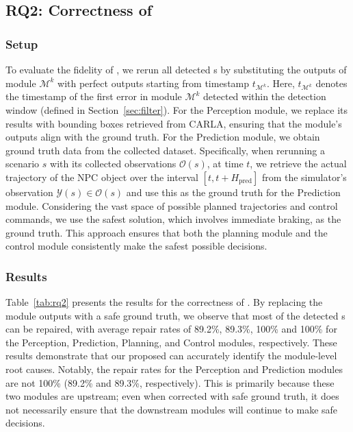 \subsection{RQ2: Correctness of \oracle}
\label{sec:exp_rq2}

\subsubsection{Setup}
To evaluate the fidelity of \oracle, we rerun all detected {\mccs}s by substituting the outputs of module $\mathcal{M}^{k}$ with perfect outputs starting from timestamp $t_{\mathcal{M}^{k}}$. 
Here, \( t_{\mathcal{M}^{k}} \) denotes the timestamp of the first error in module \( \mathcal{M}^{k} \) detected within the detection window (defined in Section~\ref{sec:filter}).
For the Perception module, we replace its results with bounding boxes retrieved from CARLA, ensuring that the module's outputs align with the ground truth. For the Prediction module, we obtain ground truth data from the collected dataset. Specifically, when rerunning a scenario $s$ with its collected observations $\mathcal{O}(s)$, at time $t$, we retrieve the actual trajectory of the NPC object over the interval $[t, t + H_{\text{pred}}]$ from the simulator's observation $\mathcal{Y}(s) \in \mathcal{O}(s)$ and use this as the ground truth for the Prediction module.
Considering the vast space of possible planned trajectories and control commands, we use the safest solution, which involves immediate braking, as the ground truth. This approach ensures that both the planning module and the control module consistently make the safest possible decisions.

\subsubsection{Results} 
Table~\ref{tab:rq2} presents the results for the correctness of \oracle. By replacing the module outputs with a safe ground truth, we observe that most of the detected {\mccs}s can be repaired, with average repair rates of 89.2\%, 89.3\%, 100\% and 100\% for the Perception, Prediction, Planning, and Control modules, respectively. These results demonstrate that our proposed \oracle can accurately identify the module-level root causes.
Notably, the repair rates for the Perception and Prediction modules are not 100\% (89.2\% and 89.3\%, respectively). This is primarily because these two modules are upstream; even when corrected with safe ground truth, it does not necessarily ensure that the downstream modules will continue to make safe decisions.

